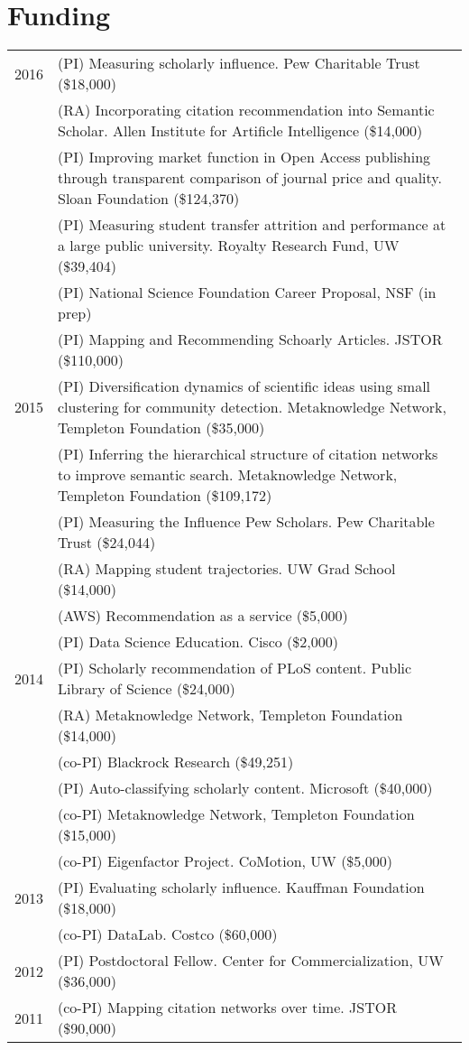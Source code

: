 \documentclass[11pt]{article}
\begin{document}
\section*{\textbf{Funding}}
\begin{longtable}{p{0.5in}|p{5.5in}}
  2016  & (PI) Measuring scholarly influence. Pew Charitable Trust (\$18,000) \\
        & (RA) Incorporating citation recommendation into Semantic Scholar. Allen Institute for Artificle Intelligence (\$14,000) \\
        & (PI) Improving market function in Open Access publishing through transparent comparison of journal price and quality. Sloan Foundation (\$124,370) \\
        & (PI) Measuring student transfer attrition and performance at a large public university. Royalty Research Fund, UW (\$39,404) \\
        & (PI) National Science Foundation Career Proposal, NSF (in prep) \\
        & (PI) Mapping and Recommending Schoarly Articles. JSTOR (\$110,000) \\ 
  2015  & (PI) Diversification dynamics of scientific ideas using small clustering for community detection. Metaknowledge Network, Templeton Foundation (\$35,000) \\
        & (PI) Inferring the hierarchical structure of citation networks to improve semantic search. Metaknowledge Network, Templeton Foundation (\$109,172) \\
        & (PI) Measuring the Influence Pew Scholars. Pew Charitable Trust (\$24,044) \\
        & (RA) Mapping student trajectories. UW Grad School (\$14,000) \\
        & (AWS) Recommendation as a service (\$5,000) \\
        & (PI) Data Science Education. Cisco (\$2,000) \\
  2014  & (PI) Scholarly recommendation of PLoS content. Public Library of Science (\$24,000) \\
        & (RA) Metaknowledge Network, Templeton Foundation (\$14,000) \\
        & (co-PI) Blackrock Research (\$49,251) \\
        & (PI) Auto-classifying scholarly content. Microsoft (\$40,000) \\
        & (co-PI) Metaknowledge Network, Templeton Foundation (\$15,000) \\
        & (co-PI) Eigenfactor Project. CoMotion, UW (\$5,000) \\ 
  2013  & (PI) Evaluating scholarly influence. Kauffman Foundation (\$18,000) \\
        & (co-PI) DataLab. Costco (\$60,000) \\ 
  2012  & (PI) Postdoctoral Fellow. Center for Commercialization, UW (\$36,000) \\ 
  2011  & (co-PI) Mapping citation networks over time. JSTOR (\$90,000) \\ 
  

\end{longtable}
\end{document}
